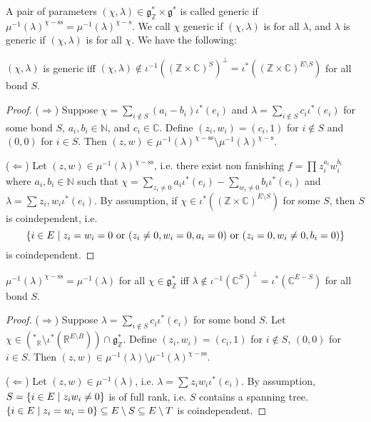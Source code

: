 \documentclass[b5paper]{article}
\newcommand{\del}{\setminus}
\newcommand{\sstab}{\mathrm{ss}}
\newcommand{\stab}{\mathrm{s}}
\begin{document}
A pair of parameters $(\chi,\lambda)\in \mathfrak{g}^*_{\mathbb{Z}}\times \mathfrak{g}^*$ is called generic if $\mu^{-1}(\lambda)^{\chi-\sstab}=\mu^{-1}(\lambda)^{\chi-\stab}$. We call $\chi$ generic if $(\chi,\lambda)$ is for all $\lambda$, and $\lambda$ is generic if $(\chi,\lambda)$ is for all $\chi$. We have the following:

\begin{proposition}[pps:]{}
  $(\chi,\lambda)$ is generic iff $(\chi,\lambda)\notin \iota^{-1}((\mathbb{Z}\times \mathbb{C})^S)^\perp=\iota^*((\mathbb{Z}\times \mathbb{C})^{E\del S})$ for all bond $S$.
  \begin{proof}
    ($\Rightarrow $) Suppose $\chi=\sum_{i\notin S}^{}(a_i-b_i)\iota^*(e_i)$ and $\lambda=\sum_{i\notin S}c_i\iota^*(e_i)$ for some bond $S$, $a_i,b_i\in \mathbb{N}$, and $c_i\in \mathbb{C}$. Define $(z_i,w_i)=(c_i,1)$ for $i\notin S$ and $(0,0)$ for $i\in S$. Then $(z,w)\in \mu^{-1}(\lambda)^{\chi-\sstab}\del\mu^{-1}(\lambda)^{\chi-\stab}$.

    ($\Leftarrow $) Let $(z,w)\in \mu^{-1}(\lambda)^{\chi-\sstab}$, i.e. there exist non fanishing $f=\prod_{}^{}z_i^{a_i}w_i^{b_i}$ where $a_i,b_i\in \mathbb{N}$ such that $\chi=\sum_{z_i\neq 0}^{}a_i\iota^*(e_i)-\sum_{w_i\neq 0}^{}b_i\iota^*(e_i)$ and $\lambda=\sum_{}^{}z_i,w_i\iota^*(e_i)$. By assumption, if $\chi\in \iota^*((\mathbb{Z}\times \mathbb{C})^{E\del S})$ for some $S$, then $S$ is coindependent, i.e. 
    \[
      \left\{i\in E\mid z_i=w_i=0\textnormal{ or }(z_i\neq 0,w_i=0,a_i=0)\textnormal{ or }(z_i=0,w_i\neq 0,b_i=0)\right\}
    \]
    is coindependent.
  \end{proof}
\end{proposition}

\begin{proposition}[pps:]{}
  $\mu^{-1}(\lambda)^{\chi-\sstab}=\mu^{-1}(\lambda)$ for all $\chi\in \mathfrak{g}^*_{\mathbb{Z}}$ iff $\lambda\notin \iota^{-1}(\mathbb{C}^S)^\perp=\iota^*(\mathbb{C}^{E-S})$ for all bond $S$.
  \begin{proof}
    ($\Rightarrow $) Suppose $\lambda=\sum_{i\notin S}^{}c_i\iota^*(e_i)$ for some bond $S$. Let $\chi\in (\mathfrak{^*}_\mathbb{R}\setminus \iota^*(\mathbb{R}^{E\del B})) \cap \mathfrak{g}^*_\mathbb{Z}$. Define $(z_i,w_i)=(c_i,1)$ for $i\notin S$, $(0,0)$ for $i\in S$. Then $(z,w)\in \mu^{-1}(\lambda)\setminus \mu^{-1}(\lambda)^{\chi-\sstab}$.

    ($\Leftarrow $) Let $(z,w)\in \mu^{-1}(\lambda)$, i.e. $\lambda=\sum_{}^{}z_iw_i\iota^*(e_i)$. By assumption, $S=\left\{i\in E\mid z_iw_i\neq 0\right\}$ is of full rank, i.e. $S$ contains a spanning tree. $\CB{i\in E\mid z_i=w_i=0}\subseteq E\del S\subseteq E\del T$ is coindependent.
  \end{proof}
\end{proposition}
\end{document}
